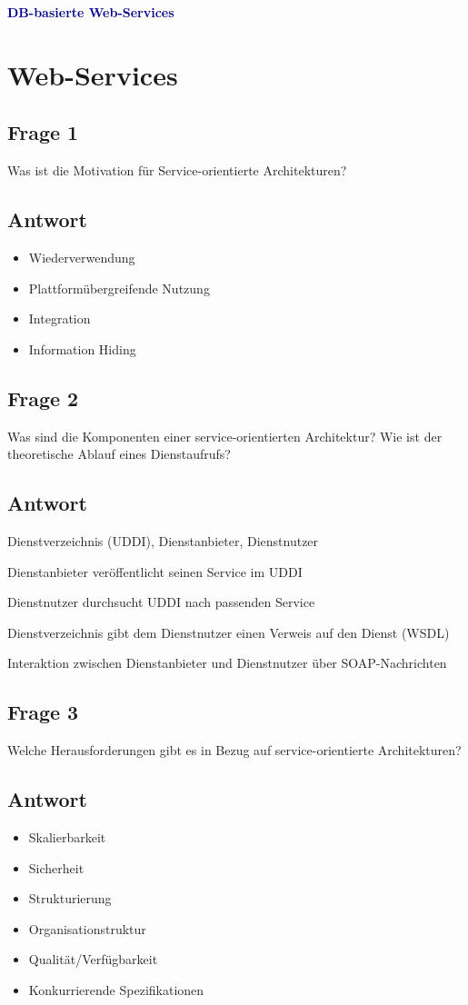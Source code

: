 \textbf{\textcolor{darkblue}{ DB-basierte Web-Services}}~

\section*{Web-Services}
\subsection*{Frage 1}
Was ist die Motivation für Service-orientierte Architekturen?
\subsection*{Antwort}
\begin{itemize}
	\item Wiederverwendung
	\item Plattformübergreifende Nutzung
    \item Integration
    \item Information Hiding
\end{itemize}

\subsection*{Frage 2}
Was sind die Komponenten einer service-orientierten Architektur? Wie ist der theoretische Ablauf eines Dienstaufrufs?
\subsection*{Antwort}
	\item Dienstverzeichnis (UDDI), Dienstanbieter, Dienstnutzer
	\item Dienstanbieter veröffentlicht seinen Service im UDDI
	\item Dienstnutzer durchsucht UDDI nach passenden Service
	\item Dienstverzeichnis gibt dem Dienstnutzer einen Verweis auf den Dienst (WSDL)
	\item Interaktion zwischen Dienstanbieter und Dienstnutzer über SOAP-Nachrichten
\subsection*{Frage 3}
Welche Herausforderungen gibt es in Bezug auf service-orientierte Architekturen?
\subsection*{Antwort}
\begin{itemize}
	\item Skalierbarkeit
	\item Sicherheit
	\item Strukturierung
	\item Organisationstruktur
	\item Qualität/Verfügbarkeit
	\item Konkurrierende Spezifikationen
\end{itemize}
